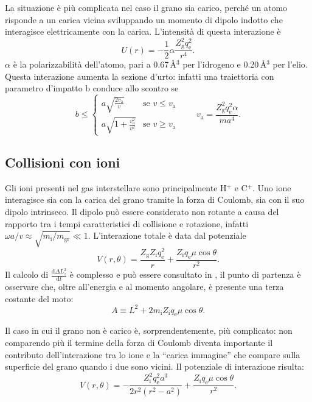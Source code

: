 La situazione è più complicata nel caso il grano sia carico, perché un atomo risponde a un carica vicina sviluppando un momento di dipolo indotto che interagisce elettricamente con la carica. L'intensità di questa interazione è
\begin{equation}
\label{poten}
U(r) = - \frac{1}{2} \alpha \frac{Z_{\mathrm{g}}^2 q_{\mathrm{e}}^2}{r^4}.
\end{equation}
$\alpha$ è la polarizzabilità dell'atomo, pari a 0.67\,\AA{}$^3$ per l'idrogeno e 0.20\,\AA{}$^3$ per l'elio.
Questa interazione aumenta la sezione d'urto: infatti una traiettoria con parametro d'impatto b conduce allo scontro se
\begin{equation}
b \leqslant
\begin{cases}
	a \sqrt{\frac{2v_{\mathrm{a}}}{v}} & \text{se } v \leqslant v_{\mathrm{a}} \\
	a \sqrt{1+ \frac{v_{\mathrm{a}}^2}{v^2} }& \text{se } v \geqslant v_{\mathrm{a}}
\end{cases}
\qquad v_{\mathrm{a}} = \frac{Z_{\mathrm{g}}^2q_{\mathrm{e}}^2\alpha}{ma^4}.
\end{equation}

\subsection{Collisioni con ioni}
Gli ioni presenti nel gas interstellare sono principalmente H$^+$ e C$^+$.
Uno ione interagisce sia con la carica del grano tramite la forza di Coulomb, sia con il suo dipolo intrinseco. Il dipolo può essere considerato non rotante a causa del rapporto tra i tempi caratteristici di collisione e rotazione, infatti $\omega a/v \approx \sqrt{m_{\mathrm{i}}/m_{\mathrm{gr}}} \ll 1$.
L'interazione totale è data dal potenziale
\begin{equation}
V(r,\theta) = \frac{Z_{\mathrm{g}}Z_{\mathrm{i}}q_{\mathrm{e}}^2}{r} + \frac{Z_{\mathrm{i}}q_{\mathrm{e}}\mu \cos\theta}{r^2}.
\end{equation}
Il calcolo di $\frac{\mathrm{d}\Delta L_z^2}{\mathrm{d}t}$ è complesso e può essere consultato in \textcite[1063]{Ali}, il punto di partenza è osservare che, oltre all'energia e al momento angolare, è presente una terza costante del moto:
\begin{equation}
A \equiv L^2 + 2m_{\mathrm{i}}Z_{\mathrm{i}}q_{\mathrm{e}}\mu\cos\theta.
\end{equation}

Il caso in cui il grano non è carico è, sorprendentemente, più complicato: non comparendo più il termine della forza di Coulomb diventa importante il contributo dell'interazione tra lo ione e la ``carica immagine'' che compare sulla superficie del grano quando i due sono vicini. Il potenziale di interazione risulta:
\begin{equation}
V(r,\theta) = -\frac{Z_{\mathrm{i}}^2 q_{\mathrm{e}}^2 a^3}{2r^2(r^2-a^2)} + \frac{Z_{\mathrm{i}}q_{\mathrm{e}}\mu \cos\theta}{r^2}.
\end{equation}

